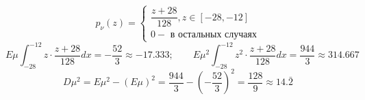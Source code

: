 \[
p_{\nu} (z) =
\begin{cases}
	\dfrac{z + 28}{128}, z \in [-28,-12] \\
	0 - \text{ в остальных случаях}
\end{cases}
\]
\[ E\mu \int_{-28}^{-12} z \cdot \frac{z + 28}{128} dx = -\frac{52}{3} \approx -17.333; ~~~~~~~~~ E\mu^2 \int_{-28}^{-12} z^2 \cdot \frac{z + 28}{128} dx = \frac{944}{3} \approx 314.667 \]
\[ D\mu^2 = E\mu^2 - (E\mu)^2 = \frac{944}{3} - \left( -\frac{52}{3} \right)^2 = \frac{128}{9} \approx 14.\bar{2} \]

 